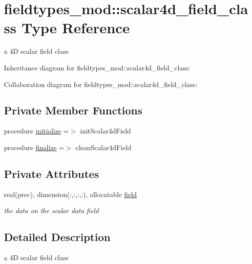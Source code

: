 \hypertarget{structfieldtypes__mod_1_1scalar4d__field__class}{}\section{fieldtypes\+\_\+mod\+:\+:scalar4d\+\_\+field\+\_\+class Type Reference}
\label{structfieldtypes__mod_1_1scalar4d__field__class}


a 4D scalar field class  




Inheritance diagram for fieldtypes\+\_\+mod\+:\+:scalar4d\+\_\+field\+\_\+class\+:


Collaboration diagram for fieldtypes\+\_\+mod\+:\+:scalar4d\+\_\+field\+\_\+class\+:
\subsection*{Private Member Functions}
\begin{DoxyCompactItemize}
\item 
procedure \mbox{\hyperlink{structfieldtypes__mod_1_1scalar4d__field__class_a0ce4946e3ff5282539ae851e451e3b9c}{initialize}} =$>$ init\+Scalar4d\+Field
\item 
procedure \mbox{\hyperlink{structfieldtypes__mod_1_1scalar4d__field__class_ab244331eb650625ca1b6b45a62e3643b}{finalize}} =$>$ clean\+Scalar4d\+Field
\end{DoxyCompactItemize}
\subsection*{Private Attributes}
\begin{DoxyCompactItemize}
\item 
real(prec), dimension(\+:,\+:,\+:,\+:), allocatable \mbox{\hyperlink{structfieldtypes__mod_1_1scalar4d__field__class_aa0022774a139bc2d79c23fce42ab167a}{field}}
\begin{DoxyCompactList}\small\item\em the data on the scalar data field \end{DoxyCompactList}\end{DoxyCompactItemize}


\subsection{Detailed Description}
a 4D scalar field class 


